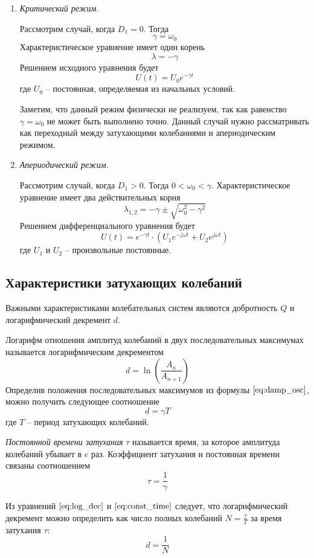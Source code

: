 \begin{enumerate}
	\item \textit{Критический режим}. 
	
	Рассмотрим случай, когда $D_1 = 0$. Тогда 
	$$
	\gamma = \omega_0
	$$
	Характеристическое уравнение имеет один корень
	$$
	\lambda = - \gamma
	$$
	Решением исходного уравнения будет
	$$
	U(t) = U_0 e^{-\gamma t}
	$$
	где $U_0$ -- постоянная, определяемая из начальных условий.
	
	Заметим, что данный режим физически не реализуем, так как равенство $\gamma = \omega_0$ не может быть выполнено точно. Данный случай нужно рассматривать как переходный между затухающими колебаниями и апериодическим режимом.
	
	\item \textit{Апериодический режим}. 
	
	Рассмотрим случай, когда $D_1 > 0$. Тогда $0 < \omega_0 < \gamma$. Характеристическое уравнение имеет два действительных корня
	$$
	\lambda_{1,2} = -\gamma \pm \sqrt{\omega_0^2 - \gamma^2}
	$$
	Решением дифференциального уравнения будет
	$$
	U(t) = e^{-\gamma t} \cdot (U_1 e^{-j\omega t} + U_2 e^{j\omega t})
	$$
	где $U_1$ и $U_2$ -- произвольные постоянные.
\end{enumerate}

\subsection*{Характеристики затухающих колебаний}

Важными характеристиками колебательных систем являются добротность $Q$ и логарифмический декремент $d$.

Логарифм отношения амплитуд колебаний в двух последовательных максимумах называется логарифмическим декрементом
$$
d = \ln{\left(\frac{A_n}{A_{n+1}}\right)}
$$
Определив положения последовательных максимумов из формулы $\ref{eq:damp_osc}$, можно получить следующее соотношение
\begin{equation*}
	d = \gamma T
	\label{eq:log_dec}
\end{equation*}
где $T$ -- период затухающих колебаний.

\textit{Постоянной времени затухания} $\tau$ называется время, за которое амплитуда колебаний убывает в $e$ раз. Коэффициент затухания и постоянная времени связаны соотношением
\begin{equation*}
	\tau = \frac{1}{\gamma}
	\label{eq:const_time}
\end{equation*}

Из уравнений $\ref{eq:log_dec}$ и $\ref{eq:const_time}$ следует, что логарифмический декремент можно определить как число полных колебаний $N = \frac{\tau}{T}$ за время затухания $\tau$:
$$
d = \frac{1}{N}
$$

